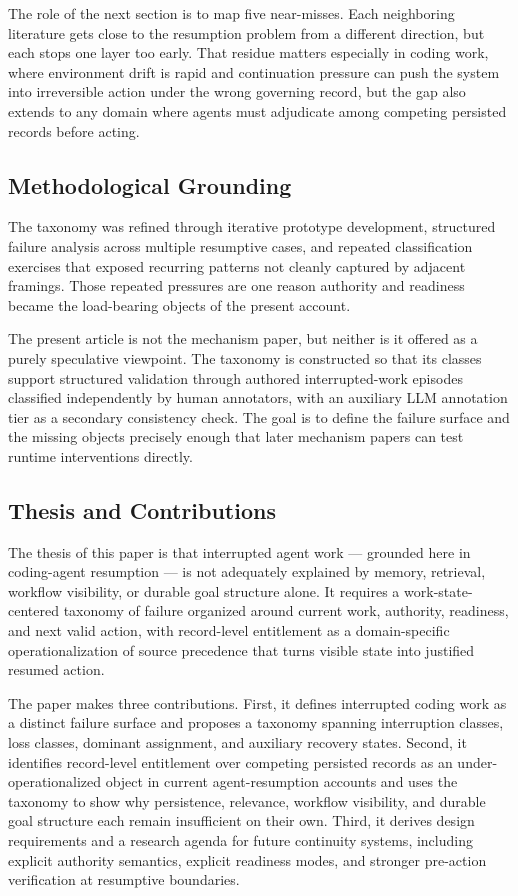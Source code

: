 \documentclass[a4paper,fleqn]{cas-sc}
\begin{document}
The role of the next section is to map five near-misses. Each neighboring literature gets close to the resumption problem from a different direction, but each stops one layer too early. That residue matters especially in coding work, where environment drift is rapid and continuation pressure can push the system into irreversible action under the wrong governing record, but the gap also extends to any domain where agents must adjudicate among competing persisted records before acting.

\subsection{Methodological Grounding}

The taxonomy was refined through iterative prototype development, structured failure analysis across multiple resumptive cases, and repeated classification exercises that exposed recurring patterns not cleanly captured by adjacent framings. Those repeated pressures are one reason authority and readiness became the load-bearing objects of the present account.

The present article is not the mechanism paper, but neither is it offered as a purely speculative viewpoint. The taxonomy is constructed so that its classes support structured validation through authored interrupted-work episodes classified independently by human annotators, with an auxiliary LLM annotation tier as a secondary consistency check. The goal is to define the failure surface and the missing objects precisely enough that later mechanism papers can test runtime interventions directly.

\subsection{Thesis and Contributions}

The thesis of this paper is that interrupted agent work --- grounded here in coding-agent resumption --- is not adequately explained by memory, retrieval, workflow visibility, or durable goal structure alone. It requires a work-state-centered taxonomy of failure organized around current work, authority, readiness, and next valid action, with record-level entitlement as a domain-specific operationalization of source precedence that turns visible state into justified resumed action.

The paper makes three contributions. First, it defines interrupted coding work as a distinct failure surface and proposes a taxonomy spanning interruption classes, loss classes, dominant assignment, and auxiliary recovery states. Second, it identifies record-level entitlement over competing persisted records as an under-operationalized object in current agent-resumption accounts and uses the taxonomy to show why persistence, relevance, workflow visibility, and durable goal structure each remain insufficient on their own. Third, it derives design requirements and a research agenda for future continuity systems, including explicit authority semantics, explicit readiness modes, and stronger pre-action verification at resumptive boundaries.
\end{document}
